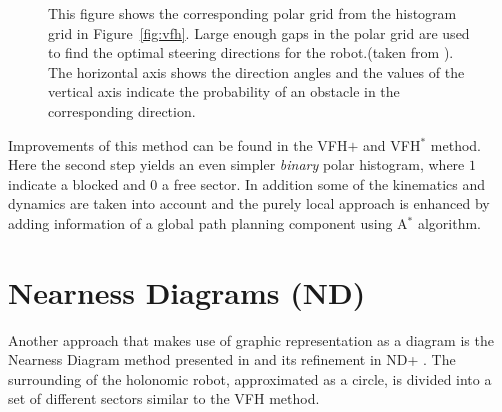 \begin{figure}[thpb]
	  \myfloatalign
      \footnotesize
      \centering
   \caption[Vector Field Polar Histogram.]{This figure shows the corresponding polar grid from the histogram grid in Figure~\ref{fig:vfh}. Large enough gaps in the polar grid are used to find the optimal steering directions for the robot.(taken from \cite{borenstein1991vector}). The horizontal axis shows the direction angles and the values of the vertical axis indicate the probability of an obstacle in the corresponding direction.}
   \label{fig:polar}
\end{figure}

Improvements of this method can be found in the VFH$+$ \cite{ulrich1998vfh+} and VFH$^*$ \cite{ulrich2000vfh} method. 
Here the second step yields an even simpler \emph{binary} polar histogram, where $1$ indicate a blocked and $0$ a free sector. 
In addition some of the kinematics and dynamics are taken into account and the purely local approach is enhanced by adding information of a global path planning component using A$^*$ algorithm. 

\section{Nearness Diagrams (ND)}
Another approach that makes use of graphic representation as a diagram is the Nearness Diagram method presented in \cite{minguez2004nearness} and its refinement in ND+ \cite{minguez2004divide}.
The surrounding of the holonomic robot, approximated as a circle, is divided into a set of different sectors similar to the VFH method.


